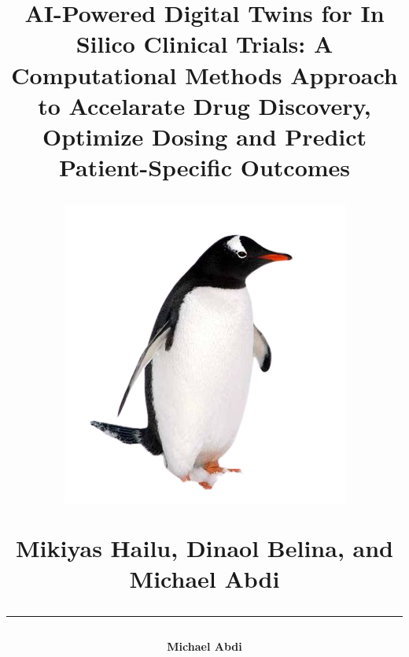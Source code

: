
\title
{
	\author{\large\textbf{Michael Abdi}\vspace{4em}}
	\textbf{AI-Powered Digital Twins for In Silico Clinical Trials: A Computational Methods Approach to Accelarate Drug Discovery, Optimize Dosing and Predict Patient-Specific Outcomes}
	\vspace{25mm}
	\centerline{\includegraphics[scale=0.2]{figures/iggy.png}}
	\selectfont \textbf{Mikiyas Hailu, Dinaol Belina, and Michael Abdi}
	\vfill
	\color{dark_blue} \rule{\linewidth}{0.4mm}
	\thispagestyle{empty}	
}